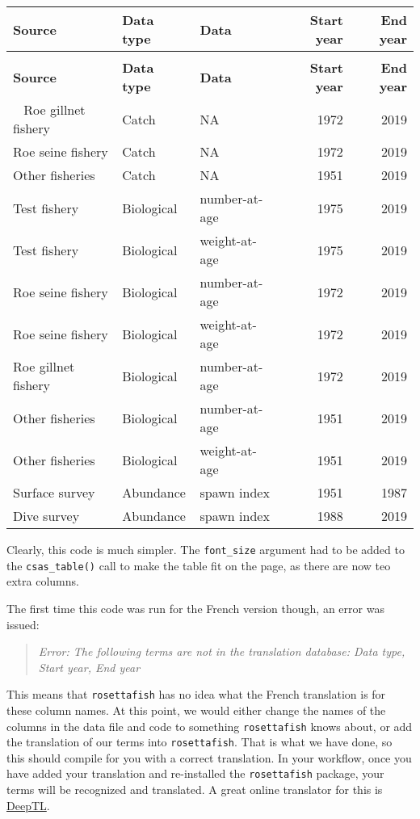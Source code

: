 \documentclass[12pt]{article}\usepackage[]{graphicx}\usepackage[]{color}
\begin{document}
\begingroup\fontsize{10}{12}\selectfont
\begingroup\fontsize{10}{12}\selectfont
\begin{longtable}[t]{lllrr}
\caption{\label{tab:herring-simple}}\\
\toprule
\textbf{Source} & \textbf{Data type} & \textbf{Data} & \textbf{Start year} & \textbf{End year}\\
\midrule
\endfirsthead
\caption*{}\\
\toprule
\textbf{Source} & \textbf{Data type} & \textbf{Data} & \textbf{Start year} & \textbf{End year}\\
\midrule
\endhead
\
\endfoot
\bottomrule
\endlastfoot
Roe gillnet fishery & Catch & NA & 1972 & 2019\\
Roe seine fishery & Catch & NA & 1972 & 2019\\
Other fisheries & Catch & NA & 1951 & 2019\\
Test fishery & Biological & number-at-age & 1975 & 2019\\
Test fishery & Biological & weight-at-age & 1975 & 2019\\
Roe seine fishery & Biological & number-at-age & 1972 & 2019\\
Roe seine fishery & Biological & weight-at-age & 1972 & 2019\\
Roe gillnet fishery & Biological & number-at-age & 1972 & 2019\\
Other fisheries & Biological & number-at-age & 1951 & 2019\\
Other fisheries & Biological & weight-at-age & 1951 & 2019\\
Surface survey & Abundance & spawn index & 1951 & 1987\\
Dive survey & Abundance & spawn index & 1988 & 2019\\*
\end{longtable}
\endgroup{} \endgroup{} Clearly, this code is much simpler. The \texttt{font\_size} argument had to be added to the \texttt{csas\_table()} call to make the table fit on the page, as there are now teo extra columns.

The first time this code was run for the French version though, an error was issued:
\begin{quote}
\emph{Error: The following terms are not in the translation database: Data type, Start year, End year}
\end{quote}
This means that \texttt{rosettafish} has no idea what the French translation is for these column names. At this point, we would either change the names of the columns in the data file and code to something \texttt{rosettafish} knows about, or add the translation of our terms into \texttt{rosettafish}. That is what we have done, so this should compile for you with a correct translation. In your workflow, once you have added your translation and re-installed the \texttt{rosettafish} package, your terms will be recognized and translated. A great online translator for this is \href{https://www.deepl.com/en/home}{DeepTL}.
\end{document}
